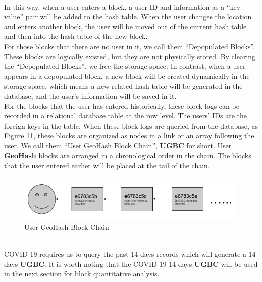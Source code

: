 \documentclass[sigplan,screen]{acmart}
\begin{document}
\\
In this way, when a user enters a block, a user ID and information as a ``key-value'' pair will be added to the hash table.
When the user changes the location and enters another block, the user will be moved out of the current hash table and then into the hash table of the new block.
\\
For those blocks that there are no user in it, we call them ``Depopulated Blocks''.
These blocks are logically existed, but they are not physically stored.
By clearing the ``Depopulated Blocks'', we free the storage space.
In contrast, when a user appears in a depopulated block, a new block will be created dynamically in the storage space, which means a new related hash table will be generated in the database, and the user's information will be saved in it.
\\
For the blocks that the user has entered historically, these block logs can be recorded in a relational database table at the row level.
The users' IDs are the foreign keys in the table.
When these block logs are queried from the database, as Figure 11, these blocks are organized as nodes in a link or an array following the user.
We call them ``User GeoHash Block Chain'', \textbf{UGBC} for short.
User \textbf{GeoHash} blocks are arranged in a chronological order in the chain.
The blocks that the user entered earlier will be placed at the tail of the chain.
\begin{figure}[htb]
	\centering\includegraphics[width=\linewidth]{block-log.png}
	\caption{User GeoHash Block Chain}
\end{figure}
\\
COVID-19 requires us to query the past 14-days records which will generate a 14-days \textbf{UGBC}.
It is worth noting that the COVID-19 14-days \textbf{UGBC} will be used in the next section for block quantitative analysis.
\end{document}
